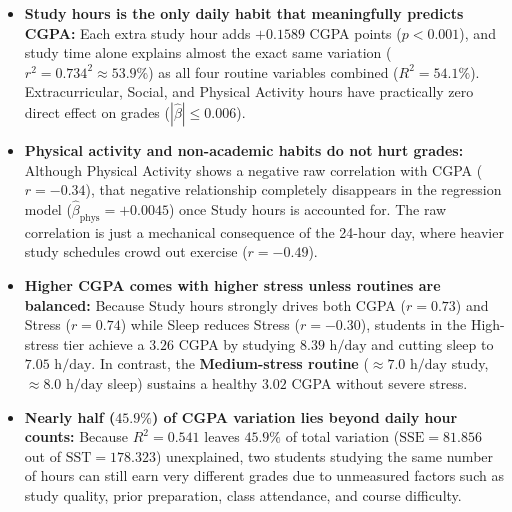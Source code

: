 \documentclass[11pt,a4paper]{article}
\newcommand{\res}[1]{{\bfseries\boldmath\color{accent}#1}}
\begin{document}
\begin{tcolorbox}[enhanced,breakable,colback=accent!5,colframe=accent,coltitle=white,
    fonttitle=\bfseries\normalsize,title={Main Conclusions},
    boxrule=0.9pt,arc=2pt,left=6pt,right=6pt,top=3pt,bottom=3pt,boxsep=1pt,
    before skip=3pt,after skip=5pt,
    borderline west={3.5pt}{0pt}{amber}]
\begin{itemize}\setlength{\itemsep}{1.5pt}\setlength{\parskip}{0pt}\setlength{\topsep}{1pt}
    \item \textbf{\textcolor{accent}{Study hours is the only daily habit that meaningfully predicts CGPA:}} Each extra study hour adds \res{$+0.1589$} CGPA points ($p < 0.001$), and study time alone explains almost the exact same variation (\res{$r^2 = 0.734^2 \approx 53.9\%$}) as all four routine variables combined (\res{$R^2 = 54.1\%$}). Extracurricular, Social, and Physical Activity hours have practically zero direct effect on grades ($|\hat{\beta}| \le 0.006$).
    \item \textbf{\textcolor{accent}{Physical activity and non-academic habits do not hurt grades:}} Although Physical Activity shows a negative raw correlation with CGPA ($r = -0.34$), that negative relationship completely disappears in the regression model (\res{$\hat{\beta}_{\text{phys}} = +0.0045$}) once Study hours is accounted for. The raw correlation is just a mechanical consequence of the 24-hour day, where heavier study schedules crowd out exercise ($r = -0.49$).
    \item \textbf{\textcolor{accent}{Higher CGPA comes with higher stress unless routines are balanced:}} Because Study hours strongly drives both CGPA ($r = 0.73$) and Stress ($r = 0.74$) while Sleep reduces Stress ($r = -0.30$), students in the High-stress tier achieve a \res{$3.26$} CGPA by studying \res{$8.39\text{ h/day}$} and cutting sleep to \res{$7.05\text{ h/day}$}. In contrast, the \textbf{Medium-stress routine} ($\approx 7.0\text{ h/day}$ study, $\approx 8.0\text{ h/day}$ sleep) sustains a healthy \res{$3.02$} CGPA without severe stress.
    \item \textbf{\textcolor{accent}{Nearly half ($45.9\%$) of CGPA variation lies beyond daily hour counts:}} Because $R^2 = 0.541$ leaves \res{$45.9\%$} of total variation ($\text{SSE} = 81.856$ out of $\text{SST} = 178.323$) unexplained, two students studying the same number of hours can still earn very different grades due to unmeasured factors such as study quality, prior preparation, class attendance, and course difficulty.
\end{itemize}
\end{tcolorbox}
\end{document}
